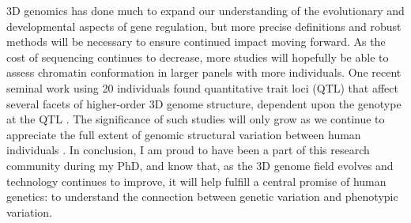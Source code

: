 3D genomics has done much to expand our understanding of the evolutionary and developmental aspects of gene regulation, but more precise definitions and robust methods will be necessary to ensure continued impact moving forward. As the cost of sequencing continues to decrease, more studies will hopefully be able to assess chromatin conformation in larger panels with more individuals. One recent seminal work using 20 individuals found quantitative trait loci (QTL) that affect several facets of higher-order 3D genome structure, dependent upon the genotype at the QTL \cite{Gorkin.2019}. The significance of such studies will only grow as we continue to appreciate the full extent of genomic structural variation between human individuals \cite{Collins.2020}. In conclusion, I am proud to have been a part of this research community during my PhD, and know that, as the 3D genome field evolves and technology continues to improve, it will help fulfill a central promise of human genetics: to understand the connection between genetic variation and phenotypic variation. 